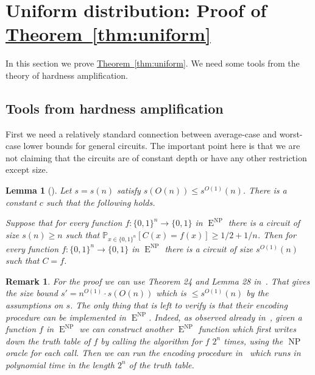 \documentclass[11pt]{article}
\newcommand{\expref}[2]{\texorpdfstring{\hyperref[#2]{#1~\ref{#2}}}{#1~\ref{#2}}}
\newtheorem{rem}[theorem]{Remark}   %
\newtheorem{lem}[theorem]{Lemma}  %
\DeclareMathOperator{\NP}{\mathrm{NP}}  %
\DeclareMathOperator{\EEE}{\mathrm{E}}  %
\newcommand{\zo}{\{0, 1\}}
\renewcommand{\P}{\mathbb{P}}
\begin{document}
\section{Uniform distribution: Proof of \expref{Theorem}{thm:uniform} \label{sec:Uniform-distribution:-Proof}}

In this section we prove \expref{Theorem}{thm:uniform}. We need some
tools from the theory of hardness amplification.

\subsection{Tools from hardness amplification}

First we need a relatively standard connection between average-case
and worst-case lower bounds for general circuits. The important point
here is that we are not claiming that the circuits are of constant
depth or have any other restriction except size.

%
%
\begin{lem}[{\cite{BFNW93,Imp95,STV01}}]
\label{lem:STV} Let $s=s(n)$ satisfy $s(O(n))\le s^{O(1)}(n)$.
There is a constant $c$ such that the following holds.

Suppose that for every function $f:\zo^{n}\to\zo$ in $\EEE^{\NP}$ there
is a circuit of size $s(n)\ge n$ such that $\P_{x\in\zo^{n}}[C(x)=f(x)]\ge1/2+1/n$.
Then for every function $f:\zo^{n}\to\zo$ in $\EEE^{\NP}$ there is a
circuit of size $s^{O(1)}(n)$ such that $C=f$.
\end{lem}

\begin{rem}
For the proof we can use Theorem 24 and Lemma 28 in~\cite{STV01}.
That gives the size bound $s'=n^{O(1)}\cdot s(O(n))$ which is $\le s^{O(1)}(n)$
by the assumptions on $s$. The only thing that is left to verify
is that their encoding procedure can be implemented in $\EEE^{\NP}$.
Indeed, as observed already in~\cite{DBLP:conf/latin/ChenOS18}, given
a function $f$ in $\EEE^{\NP}$ we can construct another $\EEE^{\NP}$ function
which first writes down the truth table of $f$ by calling the algorithm
for $f$ $2^{n}$ times, using the $\NP$ oracle for each call. Then we
can run the encoding procedure in~\cite{STV01} which runs in polynomial
time in the length $2^{n}$ of the truth table.
\end{rem}
\end{document}

